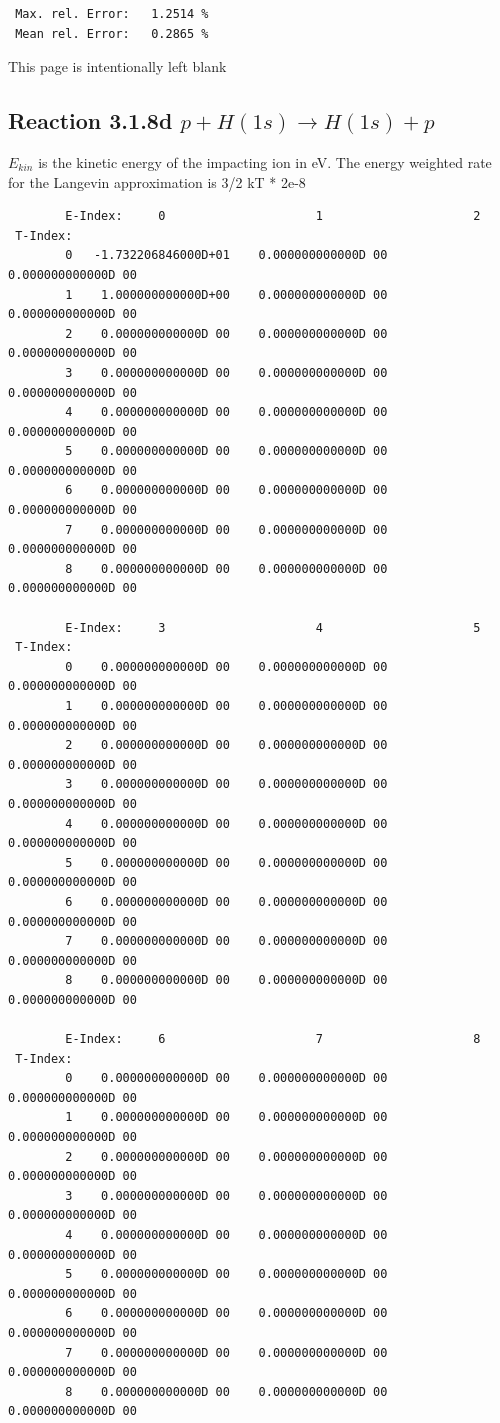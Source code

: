 \documentclass[12pt,dvips]{article}
\begin{document}
\begin{small}
\begin{verbatim}
 Max. rel. Error:   1.2514 %
 Mean rel. Error:   0.2865 %
\end{verbatim}\end{small}

\newpage
This page is intentionally left blank
\newpage
\subsection{
Reaction 3.1.8d  $p + H(1s)  \rightarrow  H(1s) + p $
}
$E_{kin}$ is the kinetic energy of the impacting ion in eV.
The energy weighted rate for the Langevin approximation is
3/2 kT * 2e-8

\begin{small}\begin{verbatim}
        E-Index:     0                     1                     2
 T-Index:
        0   -1.732206846000D+01    0.000000000000D 00    0.000000000000D 00
        1    1.000000000000D+00    0.000000000000D 00    0.000000000000D 00
        2    0.000000000000D 00    0.000000000000D 00    0.000000000000D 00
        3    0.000000000000D 00    0.000000000000D 00    0.000000000000D 00
        4    0.000000000000D 00    0.000000000000D 00    0.000000000000D 00
        5    0.000000000000D 00    0.000000000000D 00    0.000000000000D 00
        6    0.000000000000D 00    0.000000000000D 00    0.000000000000D 00
        7    0.000000000000D 00    0.000000000000D 00    0.000000000000D 00
        8    0.000000000000D 00    0.000000000000D 00    0.000000000000D 00

        E-Index:     3                     4                     5
 T-Index:
        0    0.000000000000D 00    0.000000000000D 00    0.000000000000D 00
        1    0.000000000000D 00    0.000000000000D 00    0.000000000000D 00
        2    0.000000000000D 00    0.000000000000D 00    0.000000000000D 00
        3    0.000000000000D 00    0.000000000000D 00    0.000000000000D 00
        4    0.000000000000D 00    0.000000000000D 00    0.000000000000D 00
        5    0.000000000000D 00    0.000000000000D 00    0.000000000000D 00
        6    0.000000000000D 00    0.000000000000D 00    0.000000000000D 00
        7    0.000000000000D 00    0.000000000000D 00    0.000000000000D 00
        8    0.000000000000D 00    0.000000000000D 00    0.000000000000D 00

        E-Index:     6                     7                     8
 T-Index:
        0    0.000000000000D 00    0.000000000000D 00    0.000000000000D 00
        1    0.000000000000D 00    0.000000000000D 00    0.000000000000D 00
        2    0.000000000000D 00    0.000000000000D 00    0.000000000000D 00
        3    0.000000000000D 00    0.000000000000D 00    0.000000000000D 00
        4    0.000000000000D 00    0.000000000000D 00    0.000000000000D 00
        5    0.000000000000D 00    0.000000000000D 00    0.000000000000D 00
        6    0.000000000000D 00    0.000000000000D 00    0.000000000000D 00
        7    0.000000000000D 00    0.000000000000D 00    0.000000000000D 00
        8    0.000000000000D 00    0.000000000000D 00    0.000000000000D 00


\end{verbatim}
\end{small}
\end{document}
